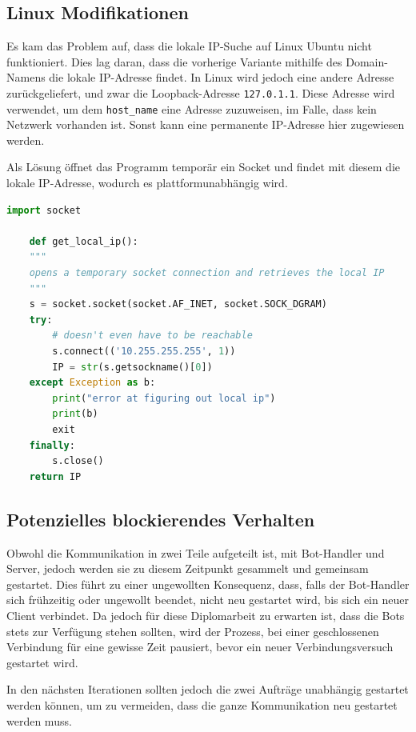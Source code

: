 \subsection{Linux Modifikationen}
Es kam das Problem auf, 
dass die lokale IP-Suche auf Linux Ubuntu nicht funktioniert.
Dies lag daran, 
dass die vorherige Variante mithilfe des Domain-Namens die lokale IP-Adresse findet.
In Linux wird jedoch eine andere Adresse zurückgeliefert, 
und zwar die Loopback-Adresse \texttt{127.0.1.1}. 
Diese Adresse wird verwendet, um dem \texttt{host\_name} eine Adresse zuzuweisen,
im Falle, dass kein Netzwerk vorhanden ist. 
Sonst kann eine permanente IP-Adresse hier zugewiesen werden.

Als Lösung öffnet das Programm temporär ein Socket 
und findet mit diesem die lokale IP-Adresse, wodurch es plattformunabhängig wird.
\begin{lstlisting}[language=python, gobble=4]
    import socket

    def get_local_ip():
    """
    opens a temporary socket connection and retrieves the local IP
    """
    s = socket.socket(socket.AF_INET, socket.SOCK_DGRAM)
    try:
        # doesn't even have to be reachable
        s.connect(('10.255.255.255', 1))
        IP = str(s.getsockname()[0])
    except Exception as b:
        print("error at figuring out local ip")
        print(b)
        exit
    finally:
        s.close()
    return IP
\end{lstlisting}

\subsection{Potenzielles blockierendes Verhalten}
Obwohl die Kommunikation in zwei Teile aufgeteilt ist, 
mit Bot-Handler und Server, 
jedoch werden sie zu diesem Zeitpunkt gesammelt und gemeinsam gestartet.
Dies führt zu einer ungewollten Konsequenz,
dass, falls der Bot-Handler sich frühzeitig oder ungewollt beendet, 
nicht neu gestartet wird, bis sich ein neuer Client verbindet.
% 
Da jedoch für diese Diplomarbeit zu erwarten ist, 
dass die Bots stets zur Verfügung stehen sollten,
wird der Prozess, bei einer geschlossenen Verbindung für eine gewisse Zeit pausiert,
bevor ein neuer Verbindungsversuch gestartet wird.

In den nächsten Iterationen sollten jedoch 
die zwei Aufträge unabhängig gestartet werden können, 
um zu vermeiden, 
dass die ganze Kommunikation neu gestartet werden muss.


